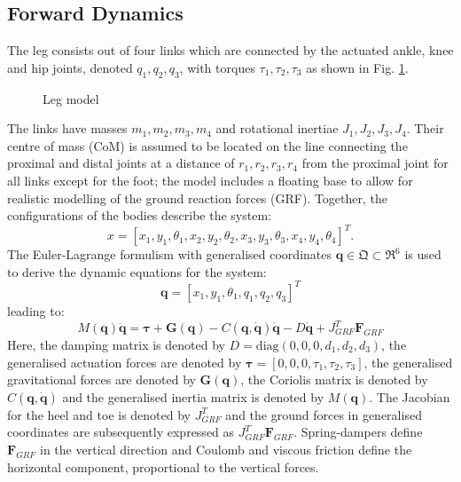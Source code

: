 \documentclass[letterpaper, 10 pt, conference]{ieeeconf}  %
\begin{document}
\subsection{Forward Dynamics} 
The leg consists out of four links which are connected by the actuated ankle, knee and hip joints, denoted $q_1,q_2,q_3$, with torques $\tau_1,\tau_2,\tau_3$ as shown in Fig. \ref{fig:leg}. 
\begin{figure}[b]
	\centering
	\caption{Leg model}
	\label{fig:leg}
\end{figure}
The links have masses $m_1,m_2,m_3,m_4$ and rotational inertiae $J_1,J_2,J_3,J_4$. Their centre of mass (CoM) is assumed to be located on the line connecting the proximal and distal joints at a distance of $r_1,r_2,r_3,r_4$ from the proximal joint for all links except for the foot; the model includes a floating base to allow for realistic modelling of the ground reaction forces (GRF). Together, the configurations of the bodies describe the system:
 \begin{equation}
x = [x_1,y_1,\theta_1,x_2,y_2,\theta_2, x_3,y_3,\theta_3,x_4,y_4,\theta_4]^T. 
\end{equation}
The Euler-Lagrange formulism with generalised coordinates $\mathbf{q} \in \mathfrak{Q} \subset \mathfrak{R}^{6}$ is used to derive the dynamic equations for the system:
 \begin{equation}
\mathbf{q}=[x_1,y_1,\theta_1,q_1,q_2,q_3]^T \label{eq:q}
 \end{equation}
leading to:
 \begin{equation}
M(\mathbf{q})\mathbf{\ddot q} = \mathbf{\boldsymbol{\tau} + G(q)} - C\mathbf{(q,\dot q)\dot q -} D \mathbf{\dot q} + J_{GRF}^T \mathbf{F}_{GRF}  \label{eq:fwddyn}
 \end{equation}
Here, the damping matrix is denoted by $D = \text{diag} (0,0,0,d_1,d_2,d_3)$, the generalised actuation forces are denoted by $\boldsymbol{\tau} = [0,0,0,\tau_1,\tau_2,\tau_3]$, the generalised gravitational forces are denoted by $\mathbf{G(q)}$, the Coriolis matrix is denoted by $C\mathbf{(q, \dot q)}$ and the generalised inertia matrix is denoted by $M(\mathbf{q})$. The Jacobian for the heel and toe is denoted by $J_{GRF}^T$ and the ground forces in generalised coordinates are subsequently expressed as $J_{GRF}^T \mathbf{F}_{GRF}$. Spring-dampers define $\mathbf{F}_{GRF}$ in the vertical direction and Coulomb and viscous friction define the horizontal component, proportional to the vertical forces.
 
\end{document}
